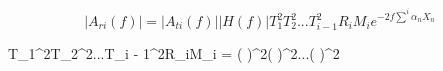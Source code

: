 $$|{A_{ri}}(f)| = |{A_{ti}}(f)||H(f)|T_1^2T_2^2...T_{i - 1}^2{R_i}{M_i}{e^{ - 2f\sum\limits_{}^i {{\alpha _n}{X_n}} }} $$



T_1^2T_2^2...T_{i - 1}^2{R_i}{M_i} = {\left( {} \right)^2}{\left( {} \right)^2}...{\left( {} \right)^2}


